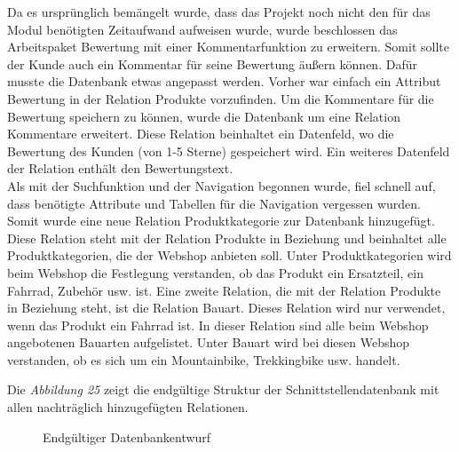 Da es ursprünglich bemängelt wurde, dass das Projekt noch nicht den für das Modul benötigten Zeitaufwand aufweisen wurde, wurde beschlossen das Arbeitspaket \glqq Bewertung\grqq{} mit einer Kommentarfunktion zu erweitern. Somit sollte der Kunde auch ein Kommentar für seine Bewertung äußern können. Dafür musste die Datenbank etwas angepasst werden. Vorher war einfach ein Attribut \glqq Bewertung\grqq{} in der Relation \glqq Produkte\grqq{} vorzufinden. Um die Kommentare für die Bewertung speichern zu können, wurde die Datenbank um eine Relation \glqq Kommentare\grqq{} erweitert. Diese Relation beinhaltet ein Datenfeld, wo die Bewertung des Kunden (von 1-5 Sterne) gespeichert wird. Ein weiteres Datenfeld der Relation enthält den Bewertungstext. \\
Als mit der Suchfunktion und der Navigation begonnen wurde, fiel schnell auf, dass benötigte Attribute und Tabellen für die Navigation vergessen wurden. Somit wurde eine neue Relation \glqq Produktkategorie\grqq{} zur Datenbank hinzugefügt. Diese Relation steht mit der Relation \glqq Produkte\grqq{} in Beziehung und beinhaltet alle Produktkategorien, die der Webshop anbieten soll. Unter Produktkategorien wird beim Webshop die Festlegung verstanden, ob das Produkt ein Ersatzteil, ein Fahrrad, Zubehör usw. ist. Eine zweite Relation, die mit der Relation Produkte in Beziehung steht, ist die Relation \glqq Bauart\grqq{}. Dieses Relation wird nur verwendet, wenn das Produkt ein Fahrrad ist. In dieser Relation sind alle beim Webshop angebotenen Bauarten aufgelistet. Unter Bauart wird bei diesen Webshop verstanden, ob es sich um ein Mountainbike, Trekkingbike usw. handelt.

Die \textit{Abbildung 25} zeigt die endgültige Struktur der Schnittstellendatenbank mit allen nachträglich hinzugefügten Relationen. 
\begin{figure}[H]
	\begin{center}
	\end{center}
	\caption{Endgültiger Datenbankentwurf}
\end{figure}

